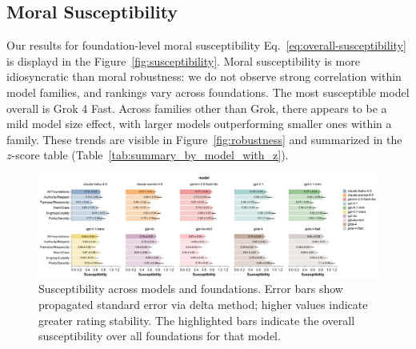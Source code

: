 \documentclass{article}
\begin{document}
\subsection{Moral Susceptibility}

Our results for foundation-level moral susceptibility Eq.~\eqref{eq:overall-susceptibility} is displayd in the Figure~\ref{fig:susceptibility}. Moral susceptibility is more idiosyncratic than moral robustness: we do not observe strong correlation within model families, and rankings vary across foundations. The most susceptible model overall is Grok 4 Fast. Across families other than Grok, there appears to be a mild model size effect, with larger models outperforming smaller ones within a family. These trends are visible in Figure~\ref{fig:robustness} and summarized in the $z$-score table (Table~\ref{tab:summary_by_model_with_z}).


\begin{figure}[!t]
  \centering
  \includegraphics[width=0.9\linewidth]{../results/susceptibility_bars.pdf}\hfill
  \caption{Susceptibility across models and foundations. Error bars show propagated standard error via delta method; higher values indicate greater rating stability. The highlighted bars indicate the overall susceptibility over all foundations for that model.}
  \label{fig:susceptibility2}
\end{figure}
\end{document}
